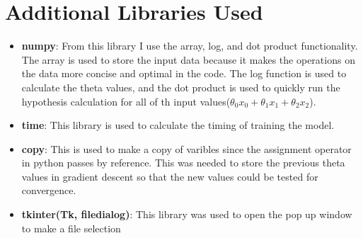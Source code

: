 \documentclass[10pt,a4paper]{article}
\begin{document}
	\section{Additional Libraries Used}
	\begin{itemize}
		\item \textbf{numpy}: From this library I use the array, log, and dot product functionality. The array is used to store the input data because it makes the operations on the data more concise and optimal in the code. The log function is used to calculate the theta values, and the dot product is used to quickly run the hypothesis calculation for all of th input values($\theta_{0}x_{0} + \theta_{1}x_{1} + \theta_{2}x_{2}$).
		\item \textbf{time}: This library is used to calculate the timing of training the model.
		\item \textbf{copy}: This is used to make a copy of varibles since the assignment operator in python passes by reference. This was needed to store the previous theta values in gradient descent so that the new values could be tested for convergence.
		\item \textbf{tkinter(Tk, filedialog)}: This library was used to open the pop up window to make a file selection
	\end{itemize}
	
\end{document}
